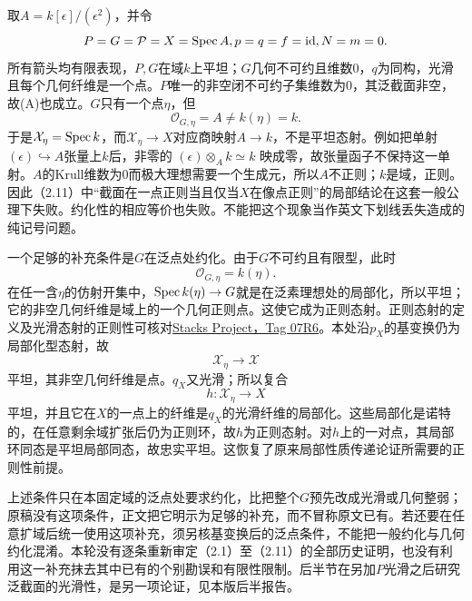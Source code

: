 取$A=k[\epsilon]/(\epsilon^2)$，并令
\[
P=G=\mathcal P=X=\operatorname{Spec} A,
 p=q=f=\mathrm{id},
 N=m=0.
\]
所有箭头均有限表现，$P,G$在域$k$上平坦；$G$几何不可约且维数$0$，$q$为同构，光滑且每个几何纤维是一个点。$P$唯一的非空闭不可约子集维数为$0$，其泛截面非空，故(A)也成立。$G$只有一个点$\eta$，但
\[
\mathscr O_{G,\eta}=A\ne k(\eta)=k.
\]
于是$\mathcal X_\eta=\operatorname{Spec} k$，而$\mathcal X_\eta\to X$对应商映射$A\to k$，不是平坦态射。例如把单射$(\epsilon)\hookrightarrow A$张量上$k$后，非零的
$(\epsilon)\otimes_Ak\simeq k$
映成零，故张量函子不保持这一单射。$A$的Krull维数为$0$而极大理想需要一个生成元，所以$A$不正则；$k$是域，正则。因此（2.11）中“截面在一点正则当且仅当$X$在像点正则”的局部结论在这套一般公理下失败。约化性的相应等价也失败。不能把这个现象当作英文下划线丢失造成的纯记号问题。

一个足够的补充条件是$G$在泛点处约化。由于$G$不可约且有限型，此时
\[
\mathscr O_{G,\eta}=k(\eta).
\]
在任一含$\eta$的仿射开集中，$\operatorname{Spec} k(\eta)\to G$就是在泛素理想处的局部化，所以平坦；它的非空几何纤维是域上的一个几何正则点。这使它成为正则态射。正则态射的定义及光滑态射的正则性可核对\href{https://stacks.math.columbia.edu/tag/07R6}{Stacks Project，Tag 07R6}。本处沿$p_X$的基变换仍为局部化型态射，故
\[
\mathcal X_\eta\longrightarrow\mathcal X
\]
平坦，其非空几何纤维是点。$q_X$又光滑；所以复合
\[
h:\mathcal X_\eta\longrightarrow X
\]
平坦，并且它在$X$的一点上的纤维是$q_X$的光滑纤维的局部化。这些局部化是诺特的，在任意剩余域扩张后仍为正则环，故$h$为正则态射。对$h$上的一对点，其局部环同态是平坦局部同态，故忠实平坦。这恢复了原来局部性质传递论证所需要的正则性前提。

上述条件只在本固定域的泛点处要求约化，比把整个$G$预先改成光滑或几何整弱；原稿没有这项条件，正文把它明示为足够的补充，而不冒称原文已有。若还要在任意扩域后统一使用这项补充，须另核基变换后的泛点条件，不能把一般约化与几何约化混淆。本轮没有逐条重新审定（2.1）至（2.11）的全部历史证明，也没有利用这一补充抹去其中已有的个别勘误和有限性限制。后半节在另加$P$光滑之后研究泛截面的光滑性，是另一项论证，见本版后半报告。
